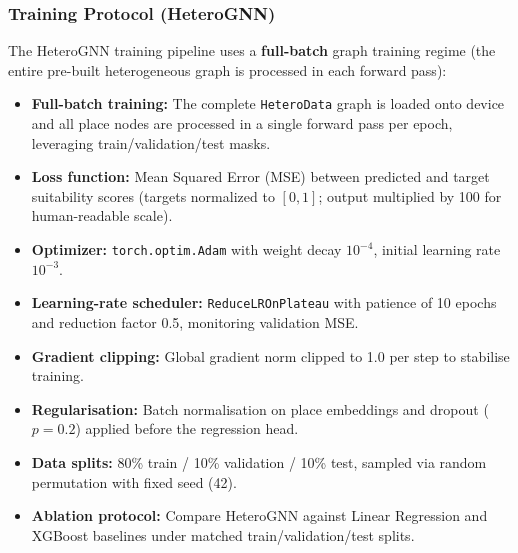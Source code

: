 \subsubsection{Training Protocol (HeteroGNN)}
The HeteroGNN training pipeline uses a \textbf{full-batch} graph training regime (the entire pre-built heterogeneous graph is processed in each forward pass):
\begin{itemize}
    \item \textbf{Full-batch training:} The complete \texttt{HeteroData} graph is loaded onto device and all place nodes are processed in a single forward pass per epoch, leveraging train/validation/test masks.
    \item \textbf{Loss function:} Mean Squared Error (MSE) between predicted and target suitability scores (targets normalized to $[0,1]$; output multiplied by 100 for human-readable scale).
    \item \textbf{Optimizer:} \texttt{torch.optim.Adam} with weight decay $10^{-4}$, initial learning rate $10^{-3}$.
    \item \textbf{Learning-rate scheduler:} \texttt{ReduceLROnPlateau} with patience of 10 epochs and reduction factor 0.5, monitoring validation MSE.
    \item \textbf{Gradient clipping:} Global gradient norm clipped to 1.0 per step to stabilise training.
    \item \textbf{Regularisation:} Batch normalisation on place embeddings and dropout ($p=0.2$) applied before the regression head.
    \item \textbf{Data splits:} 80\% train / 10\% validation / 10\% test, sampled via random permutation with fixed seed (42).
    \item \textbf{Ablation protocol:} Compare HeteroGNN against Linear Regression and XGBoost baselines under matched train/validation/test splits.
\end{itemize}

